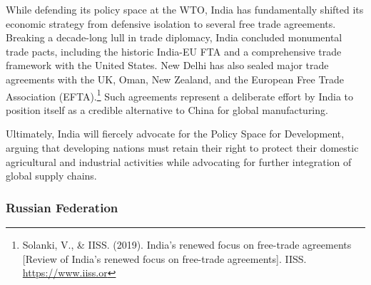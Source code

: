 While defending its policy space at the WTO, India has fundamentally shifted its economic strategy from defensive isolation to several free trade agreements. Breaking a decade-long lull in trade diplomacy, India concluded monumental trade pacts, including the historic India-EU FTA and a comprehensive trade framework with the United States. New Delhi has also sealed major trade agreements with the UK, Oman, New Zealand, and the European Free Trade Association (EFTA).\footnote{Solanki, V., \& IISS. (2019). India’s renewed focus on free-trade agreements [Review of India’s renewed focus on free-trade agreements]. IISS. \url{https://www.iiss.or}} Such agreements represent a deliberate effort by India to position itself as a credible alternative to China for global manufacturing.

Ultimately, India will fiercely advocate for the Policy Space for Development, arguing that developing nations must retain their right to protect their domestic agricultural and industrial activities while advocating for further integration of global supply chains.

\subsubsection{Russian Federation}


